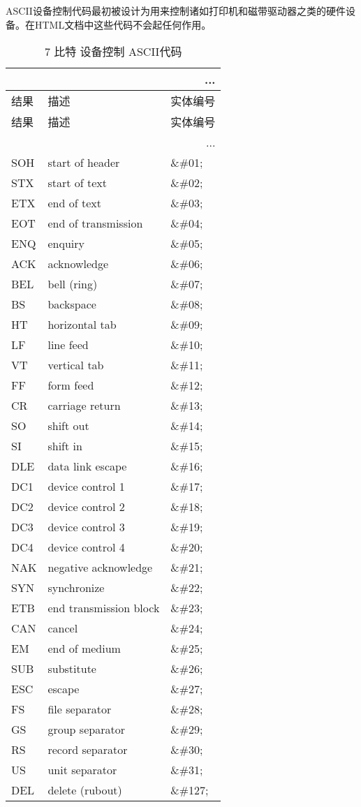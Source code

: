 ASCII设备控制代码最初被设计为用来控制诸如打印机和磁带驱动器之类的硬件设备。在HTML文档中这些代码不会起任何作用。


\begin{longtable}{|l|l|l|}
\multicolumn{3}{r}{...}
\tabularnewline\hline
结果		&描述	&实体编号
\endhead

\caption{7 比特 设备控制 ASCII代码}\\
\hline
结果		&描述	&实体编号
\tabularnewline\hline
\endfirsthead

\multicolumn{3}{r}{...}
\endfoot

\endlastfoot
\hline
NUL		&null character		&\&\#00;\\
\hline
SOH		&start of header		&\&\#01;\\
\hline
STX		&start of text			&\&\#02;\\
\hline
ETX		&end of text			&\&\#03;\\
\hline
EOT		&end of transmission	&\&\#04;\\
\hline
ENQ		&enquiry				&\&\#05;\\
\hline
ACK		&acknowledge		&\&\#06;\\
\hline
BEL		&bell (ring)			&\&\#07;\\
\hline
BS		&backspace			&\&\#08;\\
\hline
HT		&horizontal tab		&\&\#09;\\
\hline
LF		&line feed			&\&\#10;\\
\hline
VT		&vertical tab			&\&\#11;\\
\hline
FF		&form feed			&\&\#12;\\
\hline
CR		&carriage return		&\&\#13;\\
\hline
SO		&shift out			&\&\#14;\\
\hline
SI		&shift in				&\&\#15;\\
\hline
DLE		&data link escape		&\&\#16;\\
\hline
DC1		&device control 1		&\&\#17;\\
\hline
DC2		&device control 2		&\&\#18;\\
\hline
DC3		&device control 3		&\&\#19;\\
\hline
DC4		&device control 4		&\&\#20;\\
\hline
NAK		&negative acknowledge	&\&\#21;\\
\hline
SYN		&synchronize			&\&\#22;\\
\hline
ETB		&end transmission block	&\&\#23;\\
\hline
CAN		&cancel				&\&\#24;\\
\hline
EM		&end of medium		&\&\#25;\\
\hline
SUB		&substitute			&\&\#26;\\
\hline
ESC		&escape				&\&\#27;\\
\hline
FS		&file separator		&\&\#28;\\
\hline
GS		&group separator		&\&\#29;\\
\hline
RS		&record separator		&\&\#30;\\
\hline
US		&unit separator		&\&\#31;\\
\hline
DEL		&delete (rubout)		&\&\#127;\\
\hline
\end{longtable}


